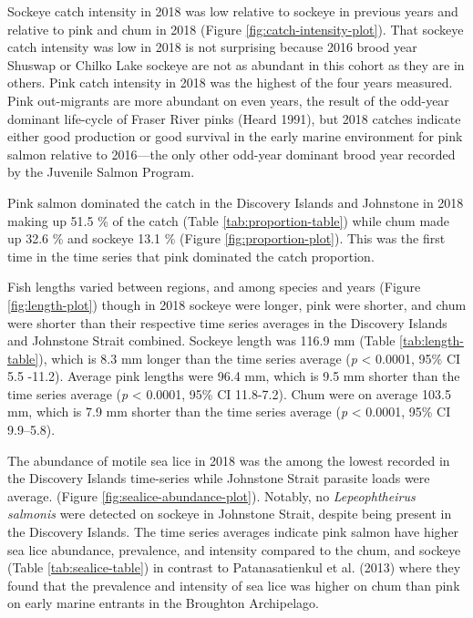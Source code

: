 \documentclass[fleqn,10pt]{wlpeerj} %
\begin{document}
Sockeye catch intensity in 2018 was low relative to sockeye in previous
years and relative to pink and chum in 2018 (Figure
\ref{fig:catch-intensity-plot}). That sockeye catch intensity was low in
2018 is not surprising because 2016 brood year Shuswap or Chilko Lake
sockeye are not as abundant in this cohort as they are in others. Pink
catch intensity in 2018 was the highest of the four years measured. Pink
out-migrants are more abundant on even years, the result of the odd-year
dominant life-cycle of Fraser River pinks (Heard 1991), but 2018 catches
indicate either good production or good survival in the early marine
environment for pink salmon relative to 2016---the only other odd-year
dominant brood year recorded by the Juvenile Salmon Program.

Pink salmon dominated the catch in the Discovery Islands and Johnstone
in 2018 making up 51.5 \% of the catch (Table
\ref{tab:proportion-table}) while chum made up 32.6 \% and sockeye 13.1
\% (Figure \ref{fig:proportion-plot}). This was the first time in the
time series that pink dominated the catch proportion.

Fish lengths varied between regions, and among species and years (Figure
\ref{fig:length-plot}) though in 2018 sockeye were longer, pink were
shorter, and chum were shorter than their respective time series
averages in the Discovery Islands and Johnstone Strait combined. Sockeye
length was 116.9 mm (Table \ref{tab:length-table}), which is 8.3 mm
longer than the time series average (\emph{p} \textless{} 0.0001, 95\%
CI 5.5 -11.2). Average pink lengths were 96.4 mm, which is 9.5 mm
shorter than the time series average (\emph{p} \textless{} 0.0001, 95\%
CI 11.8-7.2). Chum were on average 103.5 mm, which is 7.9 mm shorter
than the time series average (\emph{p} \textless{} 0.0001, 95\% CI
9.9--5.8).

The abundance of motile sea lice in 2018 was the among the lowest
recorded in the Discovery Islands time-series while Johnstone Strait
parasite loads were average. (Figure \ref{fig:sealice-abundance-plot}).
Notably, no \emph{Lepeophtheirus salmonis} were detected on sockeye in
Johnstone Strait, despite being present in the Discovery Islands. The
time series averages indicate pink salmon have higher sea lice
abundance, prevalence, and intensity compared to the chum, and sockeye
(Table \ref{tab:sealice-table}) in contrast to Patanasatienkul et al.
(2013) where they found that the prevalence and intensity of sea lice
was higher on chum than pink on early marine entrants in the Broughton
Archipelago.
\end{document}
